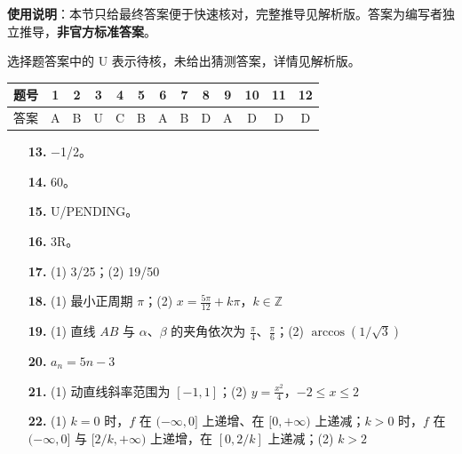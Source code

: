 
\begin{gknotice}
\textbf{使用说明}：本节只给最终答案便于快速核对，完整推导见解析版。答案为编写者独立推导，\textbf{非官方标准答案}。
\end{gknotice}

\begin{gknotice}
选择题答案中的 U 表示待核，未给出猜测答案，详情见解析版。
\end{gknotice}

\begin{center}\begin{tabular}{ccccccccccccc}
\toprule
题号 & 1 & 2 & 3 & 4 & 5 & 6 & 7 & 8 & 9 & 10 & 11 & 12 \\
\midrule
答案 & A & B & U & C & B & A & B & D & A & D & D & D \\
\bottomrule
\end{tabular}\end{center}

\begin{itemize}[leftmargin=2.6em]
  \item[\textbf{13.}] $-$1/2。
  \item[\textbf{14.}] 60。
  \item[\textbf{15.}] U/PENDING。
  \item[\textbf{16.}] 3R。
\end{itemize}

\begin{itemize}[leftmargin=2.6em]
  \item[\textbf{17.}] (1) 3/25；(2) 19/50
  \item[\textbf{18.}] (1) 最小正周期 $\pi$；(2) $x=\frac{5\pi}{12}+k\pi$，$k\in\mathbb{Z}$
  \item[\textbf{19.}] (1) 直线 $AB$ 与 $\alpha$、$\beta$ 的夹角依次为 $\frac\pi4$、$\frac\pi6$；(2) $\arccos(1/\sqrt3)$
  \item[\textbf{20.}] $a_n=5n-3$
  \item[\textbf{21.}] (1) 动直线斜率范围为 $[-1,1]$；(2) $y=\frac{x^2}{4}$，$-2\le x\le2$
  \item[\textbf{22.}] (1) $k=0$ 时，$f$ 在 $(-\infty,0]$ 上递增、在 $[0,+\infty)$ 上递减；$k>0$ 时，$f$ 在 $(-\infty,0]$ 与 $[2/k,+\infty)$ 上递增，在 $[0,2/k]$ 上递减；(2) $k>2$
\end{itemize}
